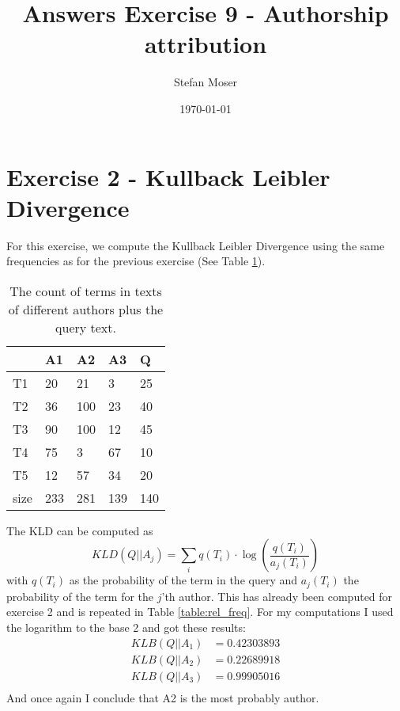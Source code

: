 \documentclass[11pt]{article}
\title{\textbf{Answers Exercise 9 - Authorship attribution}}
\author{Stefan Moser}
\date{\today}
\begin{document}
\maketitle

\section*{Exercise 2 - Kullback Leibler Divergence}
For this exercise, we compute the Kullback Leibler Divergence using the same frequencies
as for the previous exercise (See Table \ref{table:count}). 
\begin{table}[h]
\center
\begin{tabular}{|l|l|l|l|l|}
\hline
	 & A1 & A2 & A3 & Q\\
\hline
	T1 & 20 & 21 & 3 & 25\\
\hline
	T2 & 36 & 100 & 23 & 40\\
\hline
	T3 & 90 & 100 & 12 & 45\\
\hline
	T4 & 75 & 3 & 67 & 10\\
\hline
	T5 & 12 & 57 & 34 & 20\\
\hline
	size & 233 & 281 & 139 & 140\\
\hline
\end{tabular}
\caption{The count of terms in texts of different authors plus the query text.}
\label{table:count}
\end{table}
The KLD can be computed as
\begin{equation}
	KLD(Q || A_j) = \sum_i q(T_i) \cdot \log \left( \frac{q(T_i)}{a_j(T_i)} \right)
\end{equation}
with $q(T_i)$ as the probability of the term in the query and $a_j(T_i)$ the probability of 
the term for the $j$'th author. This has already been computed for exercise 2 and is repeated
in Table \ref{table:rel_freq}.
For my computations I used the logarithm to the base 2 and got these results:
\begin{align*}
	KLB(Q|| A_1) &= 0.42303893 \\
	KLB(Q|| A_2) &= 0.22689918 \\
	KLB(Q|| A_3) &= 0.99905016 \\
\end{align*}
And once again I conclude that A2 is the most probably author.
\end{document}
